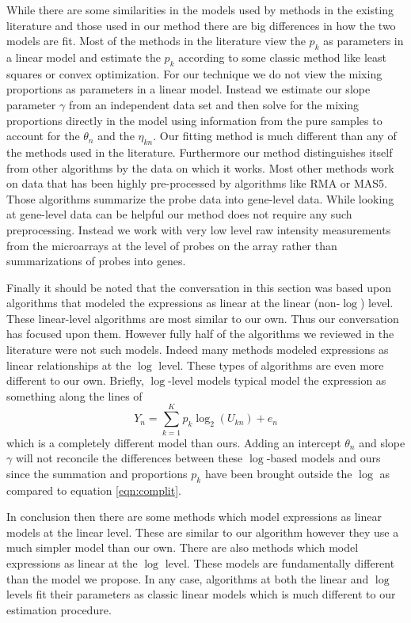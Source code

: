 \documentclass[reqno,12pt,oneside]{report}\usepackage[]{graphicx}\usepackage[]{color}
\theoremstyle{plain}
\theoremstyle{definition}
\theoremstyle{remark}
\numberwithin{theorem}{chapter}     %
\begin{document}
While there are some similarities in the models used by methods in the existing literature and those used in our method there are big differences in how the two models are fit. Most of the methods in the literature view the $p_k$ as parameters in a linear model and estimate the $p_k$ according to some classic method like least squares or convex optimization. For our technique we do not view the mixing proportions as parameters in a linear model. Instead we estimate our slope parameter $\gamma$ from an independent data set and then solve for the mixing proportions directly in the model using information from the pure samples to account for the $\theta_n$ and the $\eta_{kn}$. Our fitting method is much different than any of the methods used in the literature. Furthermore our method distinguishes itself from other algorithms by the data on which it works. Most other methods work on data that has been highly pre-processed by algorithms like RMA or MAS5. Those algorithms summarize the probe data into gene-level data. While looking at gene-level data can be helpful our method does not require any such preprocessing. Instead we work with very low level raw intensity measurements from the microarrays at the level of probes on the array rather than summarizations of probes into genes. 

Finally it should be noted that the conversation in this section was based upon algorithms that modeled the expressions as linear at the linear (non-$\log$) level. These linear-level algorithms are most similar to our own. Thus our conversation has focused upon them. However fully half of the algorithms we reviewed in the literature were not such models. Indeed many methods modeled expressions as linear relationships at the $\log$ level. These types of algorithms are even more different to our own. Briefly, $\log$-level models typical model the expression as something along the lines of 
\[
Y_n = \sum_{k=1}^{K}p_k \log_2\left(U_{kn}\right) + e_{n}
\]
which is a completely different model than ours. Adding an intercept $\theta_n$ and slope $\gamma$ will not reconcile the differences between these $\log$-based models and ours since the summation and proportions $p_k$ have been brought outside the $\log$ as compared to equation \ref{eqn:complit}.

In conclusion then there are some methods which model expressions as linear models at the linear level. These are similar to our algorithm however they use a much simpler model than our own. There are also methods which model expressions as linear at the $\log$ level. These models are fundamentally different than the model we propose. In any case, algorithms at both the linear and $\log$ levels fit their parameters as classic linear models which is much different to our estimation procedure. 
\end{document}
